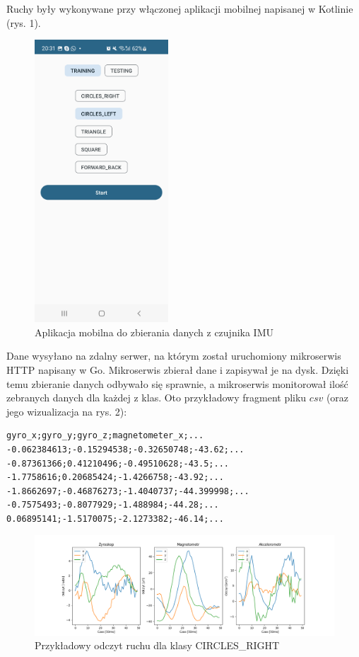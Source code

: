 \documentclass[10pt]{article}
\begin{document}
Ruchy były wykonywane przy włączonej aplikacji mobilnej napisanej w Kotlinie (rys. 1).

\begin{figure}[h]
\label{fig:screenshot}
\includegraphics[width=5cm]{s1.jpg}
\centering
\caption{Aplikacja mobilna do zbierania danych z czujnika IMU}
\end{figure}

\pagebreak

Dane wysyłano na zdalny serwer, na którym został uruchomiony mikroserwis HTTP napisany w Go. Mikroserwis zbierał dane i zapisywał je na dysk. Dzięki temu zbieranie danych odbywało się sprawnie, a mikroserwis monitorował ilość zebranych danych dla każdej z klas. Oto przykładowy fragment pliku $csv$ (oraz jego wizualizacja na rys. 2):

\begin{verbatim}  
gyro_x;gyro_y;gyro_z;magnetometer_x;...
-0.062384613;-0.15294538;-0.32650748;-43.62;...
-0.87361366;0.41210496;-0.49510628;-43.5;...
-1.7758616;0.20685424;-1.4266758;-43.92;...
-1.8662697;-0.46876273;-1.4040737;-44.399998;...
-0.7575493;-0.8077929;-1.488984;-44.28;...
0.06895141;-1.5170075;-2.1273382;-46.14;...
\end{verbatim}


\begin{figure}[H]
  \includegraphics[width=16cm]{sample.png}
  \centering
  \caption{Przykładowy odczyt ruchu dla klasy CIRCLES\_RIGHT}
\end{figure}
\end{document}
